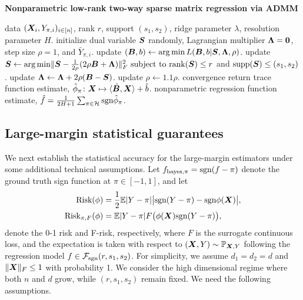 \documentclass[aos]{imsart}
\theoremstyle{definition}
\def\sign{\textup{sgn}}
\def\rank{\textup{rank}}
\def\risk{\textup{Risk}}
\def\bayespif{f_{\textup{bayes},\pi}}
\def\caliF{\tF_{\textup{sgn}}}
\def\riskF{\textup{Risk}_{\pi,F}}
\begin{document}
\begin{algorithm}[t!]
\caption{{\bf Nonparametric low-rank two-way sparse matrix regression via ADMM} } \label{alg:weighted}
\begin{algorithmic}[1] 
\INPUT data $(\bm X_i,Y_{\pi, i})_{i\in[n]}$, rank $r$, support $(s_1,s_2)$, ridge parameter $\lambda$, resolution parameter $H$.
\State initialize dual variable $\bm S$ randomly, Lagrangian multiplier $\bm{\Lambda}=\mathbf{0}$, step size $\rho=1$, and $\bar Y_{\pi, i}$.
\Repeat
\State update $(\bm B,b) \leftarrow \operatorname*{arg\,min} L(\bm B, b|\bm S,\bm{\Lambda},\rho)$.
\State update $\mS \leftarrow  \argmin \FnormSize{}{\mS-{1\over 2\rho}(2\rho\mB+\mLambda)}^2 \ \text{subject to }\rank(\mS)\leq r$ and $\text{supp}(\bm S)\leq (s_1,s_2)$.
\State update $\bm{\Lambda} \leftarrow \bm{\Lambda}+2\rho(\bm B-\bm S)$.
\State update $\rho\leftarrow1.1\rho$.
\Until convergence
\State return trace function estimate, $\hat \phi_\pi\colon \bm X\mapsto \langle \hat {\bm B}, \bm X \rangle+\hat b$.
\EndFor
\OUTPUT nonparametric regression function estimate, $\hat f= {1\over 2H+1}\sum_{\pi \in \tH}\sign \hat \phi_\pi$.
\end{algorithmic}
\end{algorithm}



\subsection{Large-margin statistical guarantees}\label{sec:large-margin}

We next establish the statistical accuracy for the large-margin estimators under some additional technical assumptions. Let $\bayespif=\sign(f-\pi)$ denote the ground truth sign function at $\pi\in[-1,1]$, and let
\begin{align} \label{eq:riskdef}
\begin{split}
\risk(\phi) & =  {1\over 2}\mathbb{E}|Y-\pi| \big|\sign(Y-\pi)-\sign \phi(\mX)\big|, \\
\riskF(\phi) & =  \mathbb{E}|Y-\pi|F\big(\phi(\mX)\sign(Y-\pi)\big), 
\end{split}
\end{align}
denote the 0-1 risk and F-risk, respectively, where $F$ is the surrogate continuous loss, and the expectation is taken with respect to $(\bm X,Y)\sim \mathbb{P}_{\bm X,Y}$ following the regression model $f\in\caliF(r,s_1,s_2)$. For simplicity, we assume $d_1 = d_2 = d$ and $\lVert\bm X\rVert_F\leq 1$ with probability 1. We consider the high dimensional regime where both $n$ and $d$ grow, while $(r,s_1,s_2)$ remain fixed. We need the following assumptions. 
 
\end{document}

